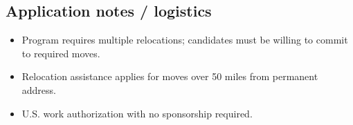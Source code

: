 \documentclass[11pt]{article}
\begin{document}
\subsection*{Application notes / logistics}
\begin{itemize}
  \item Program requires multiple relocations; candidates must be willing to commit to required moves.
  \item Relocation assistance applies for moves over 50 miles from permanent address.
  \item U.S. work authorization with no sponsorship required.
\end{itemize}
\end{document}
